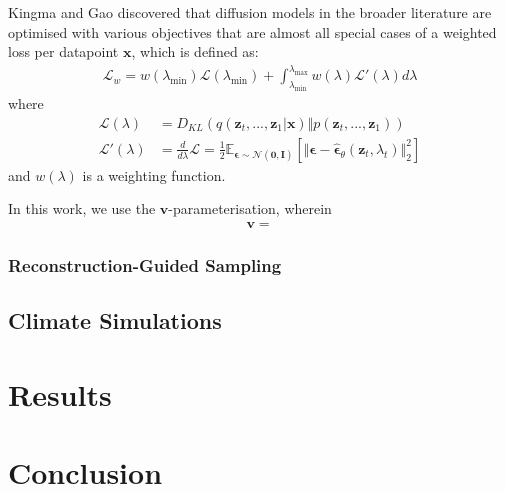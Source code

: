 \documentclass[ oneside,%
                    author={George Herbert},
                    degree={MSci},
                     title={Video Diffusion Models for Climate Simulations},
                  subtitle={}]{dissertation}
\begin{document}
Kingma and Gao \cite{Understanding_Diffusion_Objective_Kingma} discovered that diffusion models in the broader literature are optimised with various objectives that are almost all special cases of a weighted loss  per datapoint $\mathbf{x}$, which is defined as:
\begin{align}
      \mathcal{L}_w=w(\lambda_{\min})\mathcal{L}(\lambda_{\min})+\int_{\lambda_{\min}}^{\lambda_{\max}}w(\lambda)\mathcal{L}'(\lambda)d\lambda
\end{align}
where
\begin{align}
      \mathcal{L}(\lambda)&=D_{KL}(q(\mathbf{z}_t,...,\mathbf{z}_1|\mathbf{x})\Vert p(\mathbf{z}_t,...,\mathbf{z}_1))\\
      \mathcal{L}'(\lambda)&=\frac{d}{d\lambda}\mathcal{L}=\frac{1}{2}\mathbb{E}_{\boldsymbol\epsilon\sim\mathcal{N}(\mathbf{0},\mathbf{I})}\left[\Vert\boldsymbol\epsilon-\hat{\boldsymbol\epsilon}_\theta(\mathbf{z}_t,\lambda_t)\Vert_2^2\right]
\end{align}
and $w(\lambda)$ is a weighting function.

In this work, we use the $\mathbf{v}$-parameterisation, wherein
\begin{align}
      \mathbf{v} = 
\end{align}

\subsection{Reconstruction-Guided Sampling}
\label{sec:background_diffusion_reconstruction_guided_sampling}

\section{Climate Simulations}
\label{sec:background_climate}


\chapter{Results}
\label{chap:results}


\chapter{Conclusion}
\label{chap:conclusion}
\end{document}
